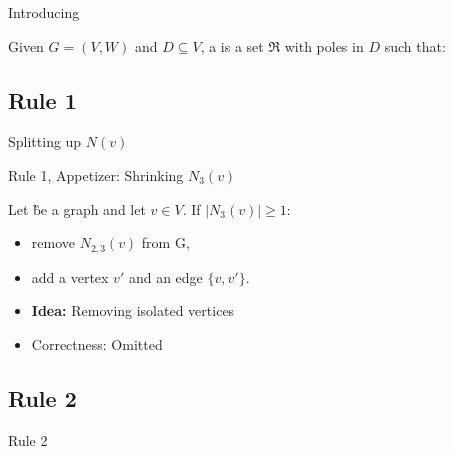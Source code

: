 \begin{frame}[c]{Introducing \dreg}
    \begin{tcolorbox}[colback=TUMBlueLighter,title={\dreg\cite{Alber2004}}]
        Given $G = (V, W)$ and $D \subseteq V$, a \dreg is a set $\mathfrak{R}$ with poles in $D$ such that:
    \end{tcolorbox}
\end{frame}


\subsection{Rule 1}
\begin{frame}[c]{Splitting up $N(v)$}
\end{frame}

\begin{frame}[c]{Rule 1, Appetizer: Shrinking $N_3(v)$}

    \begin{tcolorbox}[colback=TUMBlueLighter,title=]
        Let \G be a graph and let $v \in V$. If $|N_3(v)| \geq 1$:
        \begin{itemize}
            \item remove $N_{2,3}(v)$ from G,
            \item add a vertex $v'$ and an edge $\{v, v'\}$.
        \end{itemize}
    \end{tcolorbox}

    \begin{figure}[!ht]
    \end{figure}
    \begin{itemize}
        \item \textbf{Idea: } Removing isolated vertices
        \item Correctness: Omitted
    \end{itemize}
\end{frame}

\subsection{Rule 2}
\begin{frame}[c]{Rule 2}
    \begin{figure}[!ht]
    \end{figure}
\end{frame}

